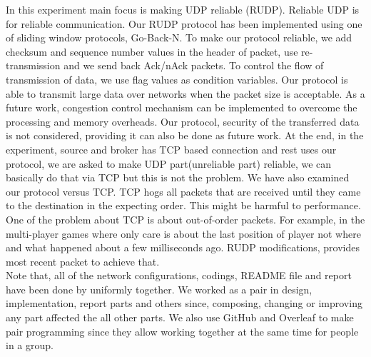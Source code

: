 In this experiment main focus is making UDP reliable (RUDP). Reliable UDP is for reliable communication. Our RUDP protocol has been implemented using one of sliding window protocols, Go-Back-N. To make our protocol reliable, we add checksum and sequence number values in the header of packet, use re-transmission and we send back Ack/nAck packets. To control the flow of transmission of data, we use flag values as condition variables. Our protocol is able to transmit large data over networks when the packet size is acceptable. As a future work, congestion control mechanism can be implemented to overcome the processing and memory overheads. Our protocol, security of the transferred data is not considered, providing it can also be done as future work. At the end, in the experiment, source and broker has TCP based connection and rest uses our protocol, we are asked to make UDP part(unreliable part) reliable, we can basically do that via TCP but this is not the problem. We have also examined our protocol versus TCP. TCP hogs all packets that are received until they came to the destination in the expecting order. This might be harmful to performance. One of the problem about TCP is about out-of-order packets. For example, in the multi-player games where only care is about the last position of player not where and what happened about a few milliseconds ago. RUDP modifications, provides most recent packet to achieve that.\\

Note that, all of the network configurations, codings, README file and report have been done by uniformly together. We worked as a pair in design, implementation, report parts and others since, composing, changing or improving any part affected the all other parts. We also use GitHub and Overleaf to make pair programming since they allow working together at the same time for people in a group.
\clearpage